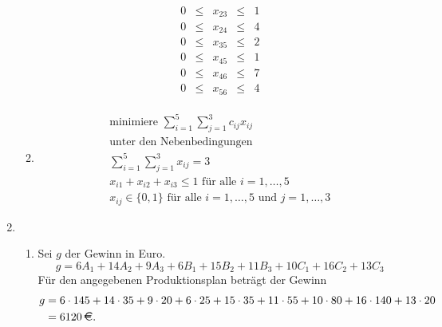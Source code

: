 \documentclass[a4paper]{scrartcl}
\begin{document}
\begin{enumerate}[label=\bfseries\arabic*.]
\begin{enumerate}
\begin{equation}
\begin{gathered}
\begin{array}{rcrcr}
                            0 & \leq & x_{23} & \leq & 1 \\
                            0 & \leq & x_{24} & \leq & 4 \\
                            0 & \leq & x_{35} & \leq & 2 \\
                            0 & \leq & x_{45} & \leq & 1 \\
                            0 & \leq & x_{46} & \leq & 7 \\
                            0 & \leq & x_{56} & \leq & 4
                        \end{array}
                    \end{gathered}
                \end{equation}

            \item
                \begin{equation}
                    \begin{gathered}
                        \text{minimiere } \sum_{i=1}^5 \sum_{j=1}^3 c_{ij}x_{ij} \\
                        \text{unter den Nebenbedingungen} \\
                        \sum_{i=1}^5 \sum_{j=1}^3 x_{ij} = 3 \\
                        x_{i1} +x_{i2} +x_{i3} \leq 1 \text{ für alle } i = 1, \dots, 5 \\
                        x_{ij} \in \{ 0, 1 \} \text{ für alle } i = 1, \dots, 5 \text{ und } j = 1, \dots, 3
                    \end{gathered}
                \end{equation}
                

        \end{enumerate}

    \item %
        \begin{enumerate}
            \item Sei $g$ der Gewinn in Euro.
                \begin{equation}
                    g = 6A_1 +14A_2 +9A_3 +6B_1 +15B_2 +11B_3 +10C_1 +16C_2 +13C_3
                \end{equation}
                Für den angegebenen Produktionsplan beträgt der Gewinn
                \begin{equation}
                    \begin{split}
                        g &= 6 \cdot 145 + 14 \cdot 35 + 9 \cdot 20 + 6 \cdot 25
                            + 15 \cdot 35 + 11 \cdot 55 + 10 \cdot 80 + 16 \cdot 140 + 13 \cdot 20 \\
                        &= 6120 \text{\,\EUR.}
                    \end{split}
                \end{equation}


\end{enumerate}
\end{enumerate}
\end{document}
